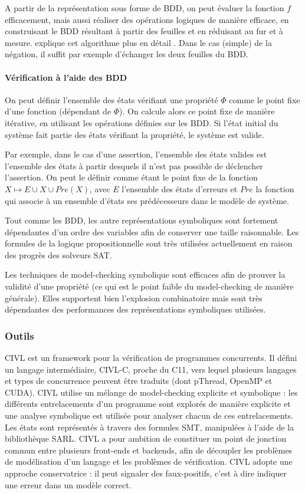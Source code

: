 A partir de la représentation sous forme de BDD, on peut évaluer la
fonction \(f\) efficacement, mais aussi réaliser des opérations logiques
de manière efficace, en construisant le BDD résultant à partir des
feuilles et en réduisant au fur et à mesure. \cite{OBDD} explique cet
algorithme plus en détail . Dans le cas (simple) de la
négation, il suffit par exemple d'échanger les deux feuilles du BDD.

\paragraph{Vérification à l'aide des BDD}

On peut définir l'ensemble des états vérifiant une propriété \(\Phi\)
comme le point fixe d'une fonction (dépendant de \(\Phi\)). On calcule
alors ce point fixe de manière itérative, en utilisant les opérations définies
sur les BDD. Si l'état initial du système fait partie des états vérifiant la
propriété, le système est valide.

Par exemple, dans le cas d'une assertion, l'ensemble des états valides
est l'ensemble des états à partir desquels il n'est pas possible de déclencher
l'assertion. On peut le définir comme étant le point fixe de la fonction
\(X \mapsto E \cup X \cup Pre(X)\), avec \(E\) l'ensemble des états
d'erreurs et \(Pre\) la fonction qui associe à un ensemble d'états ses prédécesseurs
dans le modèle de système.

Tout comme les BDD, les autre représentations symboliques sont fortement
dépendantes d'un ordre des variables afin de conserver une taille
raisonnable. Les formules de la logique propositionnelle sont très
utilisées actuellement en raison des progrès des solveurs SAT.

Les techniques de model-checking symbolique sont efficaces afin de
prouver la validité d'une propriété (ce qui est le point faible du
model-checking de manière générale). Elles supportent bien l'explosion
combinatoire mais sont très dépendantes des performances des
représentations symboliques utilisées.

\subsubsection{Outils}

CIVL\cite{CIVL} est un framework pour la vérification de programmes concurrents.
Il défini un langage intermédiaire, CIVL-C, proche du C11, vers lequel plusieurs
langages et types de concurrence peuvent être traduits (dont pThread, OpenMP et
CUDA). CIVL utilise un mélange de model-checking explicite et symbolique : les
différents entrelacements d'un programme sont explorés de manière explicite et
une analyse symbolique est utilisée pour analyser chacun de ces entrelacements.
Les états sont représentés à travers des formules SMT, manipulées à l'aide de la
bibliothèque SARL\cite{SARL}. CIVL a pour ambition de constituer un point de
jonction commun entre plusieurs front-ends et backends, afin de découpler les
problèmes de modélisation d'un langage et les problèmes de vérification. CIVL
adopte une approche conservatrice : il peut signaler des faux-positifs, c'est à
dire indiquer une erreur dans un modèle correct.

